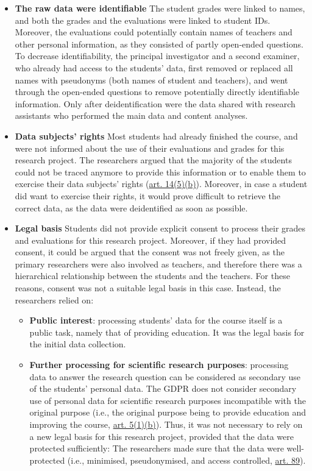 \documentclass[
]{book}
\providecommand{\tightlist}{%
  \setlength{\itemsep}{0pt}\setlength{\parskip}{0pt}}
\begin{document}
\begin{itemize}
\tightlist
\item
  \textbf{The raw data were identifiable}
  The student grades were linked to names, and both the grades and the evaluations
  were linked to student IDs. Moreover, the evaluations could potentially contain
  names of teachers and other personal information, as they consisted of partly
  open-ended questions. To decrease identifiability, the principal investigator and
  a second examiner, who already had access to the students' data, first removed or
  replaced all names with pseudonyms (both names of student and teachers), and went
  through the open-ended questions to remove potentially directly identifiable
  information. Only after deidentification were the data shared with research
  assistants who performed the main data and content analyses.
\item
  \textbf{Data subjects' rights}
  Most students had already finished the course, and were not informed about the
  use of their evaluations and grades for this research project. The researchers
  argued that the majority of the students could not be traced anymore to provide
  this information or to enable them to exercise their data subjects' rights
  (\href{https://gdpr-info.eu/art-14-gdpr/}{art. 14(5)(b)}).
  Moreover, in case a student did want to exercise their rights, it would prove
  difficult to retrieve the correct data, as the data were deidentified as soon as
  possible.
\item
  \textbf{Legal basis}
  Students did not provide explicit consent to process their grades and evaluations
  for this research project. Moreover, if they had provided consent, it could be
  argued that the consent was not freely given, as the primary researchers were
  also involved as teachers, and therefore there was a hierarchical relationship
  between the students and the teachers. For these reasons, consent was not a
  suitable legal basis in this case. Instead, the researchers relied on:

  \begin{itemize}
  \tightlist
  \item
    \textbf{Public interest}: processing students' data for the course itself is a
    public task, namely that of providing education. It was the legal basis for
    the initial data collection.
  \item
    \textbf{Further processing for scientific research purposes}: processing data to
    answer the research question can be considered as secondary use of the
    students' personal data. The GDPR does not consider secondary use of personal
    data for scientific research purposes incompatible with the original purpose
    (i.e., the original purpose being to provide education and improving the
    course, \href{https://gdpr-info.eu/art-5-gdpr/}{art. 5(1)(b)}).
    Thus, it was not necessary to rely on a new legal basis for this research
    project, provided that the data were protected sufficiently: The researchers
    made sure that the data were well-protected (i.e., minimised, pseudonymised,
    and access controlled, \href{https://gdpr-info.eu/art-89-gdpr/}{art. 89}).
  \end{itemize}
\end{itemize}
\end{document}
